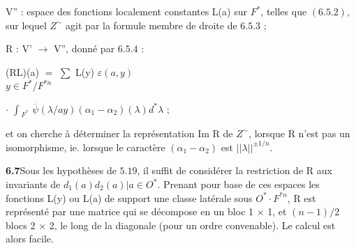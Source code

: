 \documentclass[10pt,a4paper]{article}
\begin{document}
\par V'' : espace des fonctions localement constantes L(a) sur $F^*$, telles que $(6.5.2)$, sur lequel $Z^\sim$ agit par la formule membre de droite de $6.5.3$ ;\par
\par R : V' $\to{}$ V'', donné par $6.5.4$ :\par
\par\smallskip\begin{center}\begin{minipage}{0.96\textwidth}\centering
(RL)(a) $=$ $\sum{}$ L(y) $\varepsilon{}(a,y)$ \\ $y\in{}F^*/F^{*n}$
\end{minipage}\end{center}\smallskip
\par\smallskip\begin{center}\begin{minipage}{0.96\textwidth}\centering
$\cdot{}$ $\int{}_{F^*}$ $\overline{\psi{}}(\lambda{}/ay)(\alpha{}_1-\alpha{}_2)(\lambda{})d^*\lambda{}$ ;
\end{minipage}\end{center}\smallskip
\par et on cherche à déterminer la représentation Im R de $Z^\sim$, lorsque R n'est pas un isomorphisme, ie. lorsque le caractère $(\alpha{}_1-\alpha{}_2)$ est $||\lambda{}||^{\pm{}1/n}$.\par
\par\noindent\textbf{6.7}\quad Sous les hypothèses de $5.19$, il suffit de considérer la restriction de R aux invariants de ${d_1(a)d_2(a)|a\in{}O^*}$. Prenant pour base de ces espaces les fonctions L(y) ou L(a) de support une classe latérale sous $O^*\cdot{}F^{*n}$, R est représenté par une matrice qui se décompose en un bloc 1 $\times{}$ 1, et $(n-1)/2$ blocs 2 $\times{}$ 2, le long de la diagonale (pour un ordre convenable). Le calcul est alors facile.\par
\end{document}
